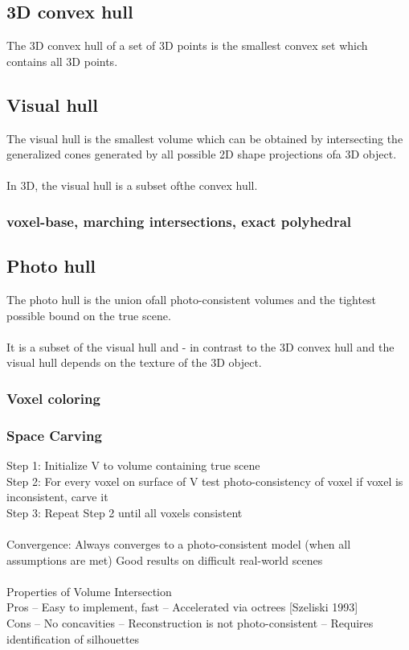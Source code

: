 \subsection{3D convex hull}
The 3D convex hull of a set of 3D points is the smallest convex set which contains all 3D points.

\subsection{Visual hull}
The visual hull is the smallest volume which can be obtained by intersecting the generalized cones generated by all possible 2D shape projections ofa 3D object.\\
\\
In 3D, the visual hull is a subset ofthe convex hull. 

\subsubsection{voxel-base, marching intersections, exact polyhedral}

\subsection{Photo hull}
The photo hull is the union ofall photo-consistent volumes and the tightest possible bound on the true scene.\\
\\
It is a subset of the visual hull and - in contrast to the 3D convex hull and the visual hull depends on the texture of the 3D object.
\subsubsection{Voxel coloring}

\subsubsection{Space Carving}

Step 1: Initialize V to volume containing true scene\\
Step 2: For every voxel on surface of V test photo-consistency of voxel if voxel is inconsistent, carve it\\
Step 3: Repeat Step 2 until all voxels consistent\\
\\

Convergence: Always converges to a photo-consistent model (when all assumptions are met)
Good results on difficult real-world scenes\\
\\
Properties of Volume Intersection\\
Pros – Easy to implement, fast – Accelerated via octrees [Szeliski 1993]\\
Cons – No concavities – Reconstruction is not photo-consistent – Requires identification of silhouettes